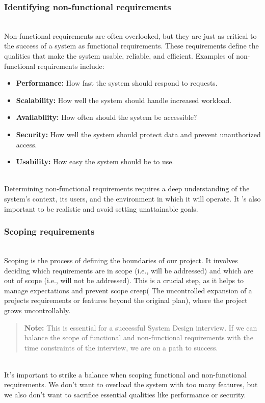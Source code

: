 \subsubsection{Identifying non-functional requirements}\label{UdPiDM4WcI6p90CEVFMEe}
\\
Non-functional requirements are often overlooked, but they are just as critical to the success of a system as functional requirements. These requirements define the qualities that make the system usable, reliable, and efficient. Examples of non-functional requirements include:

\begin{itemize}
\item
\protect{}\label{Beb0sXg99Muy9fCp32_um}
\textbf{Performance:} How fast the system should respond to requests.
\item
\protect{}\label{9DkMhvFu_m-KTq49taqd_}
\textbf{Scalability:} How well the system should handle increased workload.
\item
\protect{}\label{6iMRCwGVQksVIEusL01kf}
\textbf{Availability:} How often should the system be accessible?
\item
\protect{}\label{bvzF_Ynyz6GiBvU3bM7R2}
\textbf{Security:} How well the system should protect data and prevent unauthorized access.
\item
\protect{}\label{r51d-cq40MhaVlv9b9wLM}
\textbf{Usability:} How easy the system should be to use.
\end{itemize}
\\
Determining non-functional requirements requires a deep understanding of the system's context, its users, and the environment in which it will operate. It 's also important to be realistic and avoid setting unattainable goals.

\subsubsection{Scoping requirements}\label{5GFPf3L1agYT4xgriIS3w}
\\
Scoping is the process of defining the boundaries of our project. It involves deciding which requirements are in scope (i.e., will be addressed) and which are out of scope (i.e., will not be addressed). This is a crucial step, as it helps to manage expectations and prevent scope creep( The uncontrolled expansion of a project\textquotesingle s requirements or features beyond the original plan), where the project grows uncontrollably.
\begin{quote}
\textbf{Note:} This is essential for a successful System Design interview. If we can balance the scope of functional and non-functional requirements with the time constraints of the interview, we are on a path to success.
\end{quote}
\\
It's important to strike a balance when scoping functional and non-functional requirements. We don't want to overload the system with too many features, but we also don't want to sacrifice essential qualities like performance or security.


